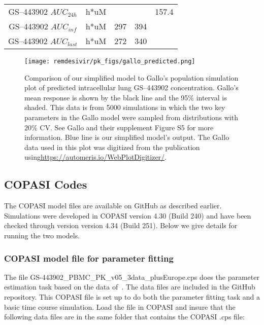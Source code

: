 \begin{table}[H]
\begin{tabular}{ccccc}
GS--443902 $AUC_{24h}$  & h*uM          &                                                                       &                                                                       & 157.4                                                                     \\ 
GS--443902 $AUC_{inf}$  & h*uM          & 297                                                                   & 394                                                                   &                                                                           \\ 
GS--443902 $AUC_{last}$ & h*uM          & 272                                                                   & 340                                                                   &                                                                           \\ 
\end{tabular}
\end{table} 

\begin{figure}[H]
\texttt{[image: remdesivir/pk\_figs/gallo\_predicted.png]}
\caption{Comparison of our simplified model to Gallo's population simulation plot of predicted intracellular lung GS--443902 concentration. Gallo's  mean response is shown by the black line and the 95\% interval is shaded. This data is from 5000 simulations in which the two key parameters in the Gallo model were sampled from distributions with 20\% CV. See Gallo and their supplement Figure S5 for more information. Blue line is our simplified model's output. The Gallo data used in this plot was digitized from the publication using\newline\url{https://automeris.io/WebPlotDigitizer/}.
\label{sup:fig:gallo_comparisson}}
\end{figure}

\subsection{COPASI Codes}
The COPASI model files are available on GitHub as described earlier. Simulations were developed in COPASI version 4.30 (Build 240) and have been checked through version version 4.34 (Build 251). Below we give details for running the two models.

\subsubsection{COPASI model file for parameter fitting}
The file {\selectfont GS-443902\_PBMC\_PK\_v05\_3data\_plusEurope.cps} does the parameter estimation task based on the 
data of~\cite{humeniuk_safety_2020}. The data files are included in the GitHub repository.
This COPASI file is set up to do both the parameter fitting task and a basic time course simulation. Load the file in COPASI and insure that the following data files are in the same folder that contains the COPASI .cps file:

